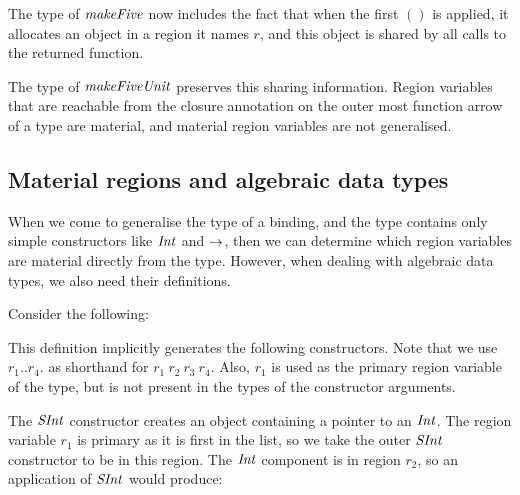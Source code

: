 The type of $\operatorname{\mathit{makeFive}}$ now includes the fact that when the first $()$ is applied, it allocates an object in a region it names $r$, and this object is shared by all calls to the returned function.

The type of $\operatorname{\mathit{makeFiveUnit}}$ preserves this sharing information. Region variables that are reachable from the closure annotation on the outer most function arrow of a type are material, and material region variables are not generalised.


\subsection{Material regions and algebraic data types}
\label{System:Closure:non-material-regions}

When we come to generalise the type of a binding, and the type contains only simple constructors like $\operatorname{\mathit{Int}}$ and $\rightarrow$, then we can determine which region variables are material directly from the type. However, when dealing with algebraic data types, we also need their definitions.

Consider the following:


This definition implicitly generates the following constructors. Note that we use $r_1..r_4.$ as shorthand for $r_1 \ r_2 \ r_3 \ r_4.$ Also, $r_1$ is used as the primary region variable of the type, but is not present in the types of the constructor arguments.


The $\operatorname{\mathit{SInt}}$ constructor creates an object containing a pointer to an $\operatorname{\mathit{Int}}$. The region variable $r_1$ is primary as it is first in the list, so we take the outer $\operatorname{\mathit{SInt}}$ constructor to be in this region. The $\operatorname{\mathit{Int}}$ component is in region $r_2$, so an application of $\operatorname{\mathit{SInt}}$ would produce:


